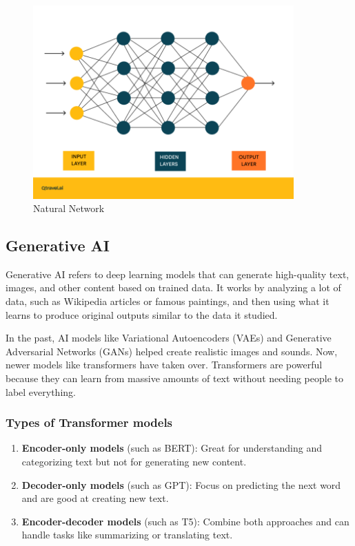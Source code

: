 \documentclass[12pt,oneside,openright,a4paper]{cpe-english-project}
\begin{document}
\begin{figure}[H]
\centering
\includegraphics[width=10cm]{./assets/Natural-Network.png}
\caption{Natural Network}\label{fig:figure-2.3}
\end{figure}

\subsection{Generative AI} Generative AI refers to deep learning models that can generate high-quality text, images, and other content based on trained data.  It works by analyzing a lot of data, such as Wikipedia articles or famous paintings, and then using what it learns to produce original outputs similar to the data it studied. \par
In the past, AI models like Variational Autoencoders (VAEs) and Generative Adversarial Networks (GANs) helped create realistic images and sounds. Now, newer models like transformers have taken over. Transformers are powerful because they can learn from massive amounts of text without needing people to label everything.

\subsubsection{Types of Transformer models}
\begin{enumerate}
	\item \textbf{Encoder-only models} (such as BERT): Great for understanding and categorizing text but not for generating new content.
	\item \textbf{Decoder-only models} (such as GPT): Focus on predicting the next word and are good at creating new text.
	\item \textbf{Encoder-decoder models} (such as T5): Combine both approaches and can handle tasks like summarizing or translating text.
\end{enumerate}
\end{document}
